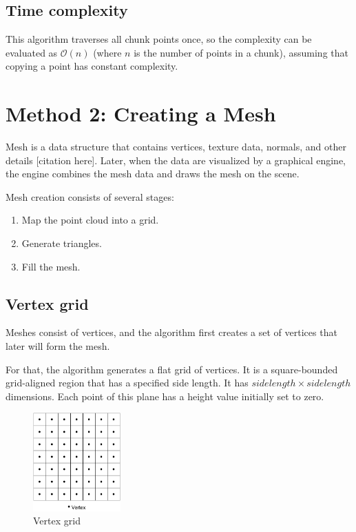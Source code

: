 \subsection{Time complexity}

This algorithm traverses all chunk points once, so the complexity can be evaluated as $\mathcal{O}(n)$ (where $n$ is the number of points in a chunk), assuming that copying a point has constant complexity.


\section{Method 2: Creating a Mesh}
\label{sec:creating_mesh}

Mesh is a data structure that contains vertices, texture data, normals, and other details [citation here]. Later, when the data are visualized by a graphical engine, the engine  combines the mesh data and draws the mesh on the scene.

Mesh creation consists of several stages:

\begin{enumerate}
    \item Map the point cloud into a grid.
    \item Generate triangles.
    \item Fill the mesh.
\end{enumerate}


\subsection{Vertex grid}

Meshes consist of vertices, and the algorithm first creates a set of vertices that later will form the mesh.

For that, the algorithm generates a flat grid of vertices. It is a square-bounded grid-aligned region that has a specified side length. It has $side length \times side length$ dimensions. Each point of this plane has a height value initially set to zero.

\begin{figure}[ht]
    \centering
    \includegraphics[width=0.3\textwidth]{vertex-grid.pdf}
    \caption{Vertex grid}
    \label{fig:vertex_grid}
\end{figure}


